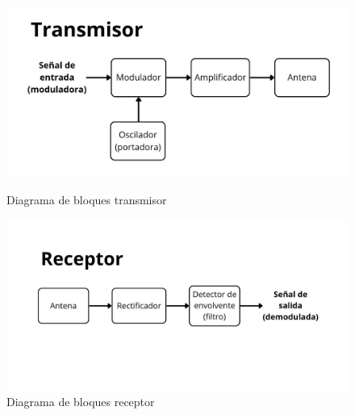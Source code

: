 \begin{figure}[ht!]
    \centering
    \begin{minipage}{0.48\linewidth}
        \centering
        \includegraphics[width=0.95\linewidth]{img/transmisor.jpg}
        \caption{Diagrama de bloques transmisor}
        \label{fig:bloques_transmisor}
    \end{minipage}\hfill
    \begin{minipage}{0.48\linewidth}
        \centering
        \includegraphics[width=0.95\linewidth]{img/receptor.jpg}
        \caption{Diagrama de bloques receptor}
        \label{fig:bloques_receptor}
    \end{minipage}
\end{figure}
